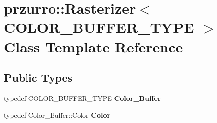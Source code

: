 \hypertarget{classprzurro_1_1_rasterizer}{}\section{przurro\+::Rasterizer$<$ C\+O\+L\+O\+R\+\_\+\+B\+U\+F\+F\+E\+R\+\_\+\+T\+Y\+PE $>$ Class Template Reference}
\label{classprzurro_1_1_rasterizer}
\subsection*{Public Types}
\begin{DoxyCompactItemize}
\item 
\mbox{\label{classprzurro_1_1_rasterizer_a3366fbd93ae7fcdc93f1966ea2d7c803}} 
typedef C\+O\+L\+O\+R\+\_\+\+B\+U\+F\+F\+E\+R\+\_\+\+T\+Y\+PE {\bfseries Color\+\_\+\+Buffer}
\item 
\mbox{\label{classprzurro_1_1_rasterizer_ad79f6c1771e78075320bd9c4ba6a6661}} 
typedef Color\+\_\+\+Buffer\+::\+Color {\bfseries Color}
\end{DoxyCompactItemize}
